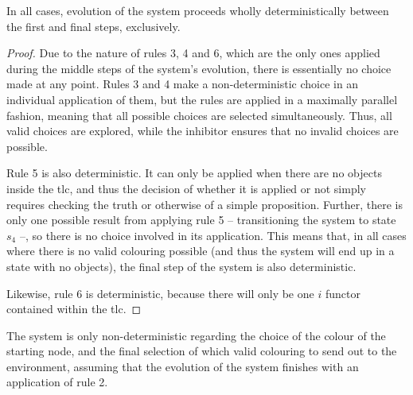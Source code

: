 \begin{proposition}\label{prop:gcol:determin}
In all cases, evolution of the system proceeds wholly deterministically between the first and final steps, exclusively.
\end{proposition}

\begin{proof}
Due to the nature of rules 3, 4 and 6, which are the only ones applied during the middle steps of the system's evolution, there is essentially no choice made at any point.  Rules 3 and 4 make a non-deterministic choice in an individual application of them, but the rules are applied in a maximally parallel fashion, meaning that all possible choices are selected simultaneously.  Thus, all valid choices are explored, while the inhibitor ensures that no invalid choices are possible.

Rule 5 is also deterministic.  It can only be applied when there are no \bo{} objects inside the \gls{tlc}, and thus the decision of whether it is applied or not simply requires checking the truth or otherwise of a simple proposition.  Further, there is only one possible result from applying rule 5 -- transitioning the system to state \(s_4\) --, so there is no choice involved in its application.  This means that, in all cases where there is no valid colouring possible (and thus the system will end up in a state with no \bo{} objects), the final step of the system is also deterministic.

Likewise, rule 6 is deterministic, because there will only be one \(i\) functor contained within the \gls{tlc}.
\end{proof}

\begin{proposition}\label{prop:gcol:nondet}
The system is only non-deterministic regarding the choice of the colour of the starting node, and the final selection of which valid colouring to send out to the environment, assuming that the evolution of the system finishes with an application of rule 2.
\end{proposition}

